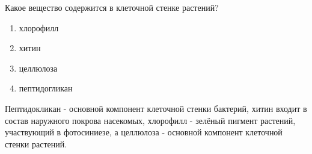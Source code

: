 
Какое вещество содержится в клеточной стенке растений?

\begin{enumerate}
    \item хлорофилл 
    \item хитин
    \item целлюлоза
    \item пептидогликан
\end{enumerate}


\explanationSection

Пептидокликан - основной компонент клеточной стенки бактерий, хитин входит в состав наружного покрова насекомых, хлорофилл - зелёный пигмент растений, участвующий в фотосиниезе, а целлюлоза - основной компонент клеточной стенки растений.

